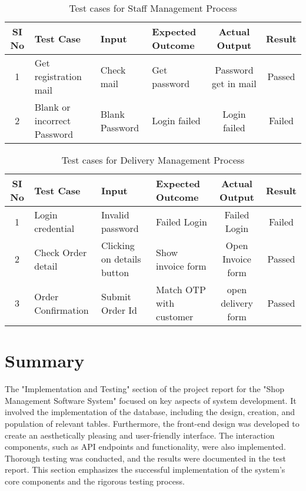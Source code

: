 \begin{table}[H]
    \centering
    \caption{Test cases for Staff Management Process}
    \label{tab:test-cases-staff-management}
    \begin{tabular}{|c|p{3cm}|p{3cm}|p{3cm}|c|c|}
        \hline
        \textbf{SI No} & \textbf{Test Case} & \textbf{Input} & \textbf{Expected Outcome} & \textbf{Actual Output} & \textbf{Result} \\ \hline
        1 & Get registration mail & Check mail & Get password & Password get in mail & Passed \\ \hline
        2 & Blank or incorrect Password & Blank Password & Login failed & Login failed & Failed \\ \hline
    \end{tabular}
\end{table}

\begin{table}[H]
    \centering
    \caption{Test cases for Delivery Management Process}
    \label{tab:test-cases-delivery-management}
    \begin{tabular}{|c|p{3cm}|p{3cm}|p{3cm}|c|c|}
        \hline
        \textbf{SI No} & \textbf{Test Case} & \textbf{Input} & \textbf{Expected Outcome} & \textbf{Actual Output} & \textbf{Result} \\ \hline
        1 & Login credential & Invalid password & Failed Login & Failed Login & Failed \\ \hline
        2 & Check Order detail & Clicking on details button & Show invoice form & Open Invoice form & Passed \\ \hline
        3 & Order Confirmation & Submit Order Id & Match OTP with customer & open delivery form & Passed \\ \hline
    \end{tabular}
\end{table}
\vspace{4cm}
\section{Summary}

The "Implementation and Testing" section of the project report for the "Shop Management Software System" focused on key aspects of system development. It involved the implementation of the database, including the design, creation, and population of relevant tables. Furthermore, the front-end design was developed to create an aesthetically pleasing and user-friendly interface. The interaction components, such as API endpoints and functionality, were also implemented. Thorough testing was conducted, and the results were documented in the test report. This section emphasizes the successful implementation of the system's core components and the rigorous testing process.